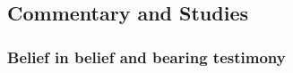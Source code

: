 

	
	
	
	
\subsection{Commentary and Studies} %
	\label{BELIEF-COMMENTARY}

	
		
	\subsubsection{Belief in belief and bearing testimony}
		\label{BELIEF-belief}
		
